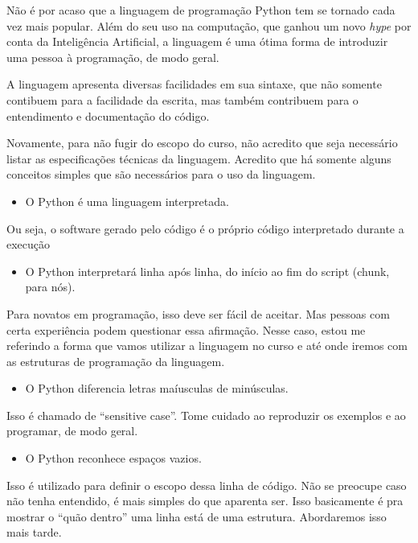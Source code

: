 \documentclass[a4paper, 11pt, brazilian]{article}
\providecommand{\tightlist}{%
      \setlength{\itemsep}{0pt}\setlength{\parskip}{0pt}}
\begin{document}
Não é por acaso que a linguagem de programação Python tem se tornado
cada vez mais popular. Além do seu uso na computação, que ganhou um novo
\emph{hype} por conta da Inteligência Artificial, a linguagem é uma
ótima forma de introduzir uma pessoa à programação, de modo geral.

A linguagem apresenta diversas facilidades em sua sintaxe, que não
somente contibuem para a facilidade da escrita, mas também contribuem
para o entendimento e documentação do código.

Novamente, para não fugir do escopo do curso, não acredito que seja
necessário listar as especificações técnicas da linguagem. Acredito que
há somente alguns conceitos simples que são necessários para o uso da
linguagem.

\begin{itemize}
\tightlist
\item
  O Python é uma linguagem interpretada.
\end{itemize}

Ou seja, o software gerado pelo código é o próprio código interpretado
durante a execução

\begin{itemize}
\tightlist
\item
  O Python interpretará linha após linha, do início ao fim do script
  (chunk, para nós).
\end{itemize}

Para novatos em programação, isso deve ser fácil de aceitar. Mas pessoas
com certa experiência podem questionar essa afirmação. Nesse caso, estou
me referindo a forma que vamos utilizar a linguagem no curso e até onde
iremos com as estruturas de programação da linguagem.

\begin{itemize}
\tightlist
\item
  O Python diferencia letras maíusculas de minúsculas.
\end{itemize}

Isso é chamado de ``sensitive case''. Tome cuidado ao reproduzir os
exemplos e ao programar, de modo geral.

\begin{itemize}
\tightlist
\item
  O Python reconhece espaços vazios.
\end{itemize}

Isso é utilizado para definir o escopo dessa linha de código. Não se
preocupe caso não tenha entendido, é mais simples do que aparenta ser.
Isso basicamente é pra mostrar o ``quão dentro'' uma linha está de uma
estrutura. Abordaremos isso mais tarde.
\end{document}
